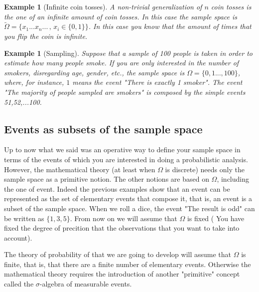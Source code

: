 \documentclass[12pt]{article}
\newtheorem{example}[theorem]{Example}
\newcommand{\<}{{\langle \!\! \langle}}
\renewcommand{\>}{{\rangle \!\! \rangle}}
\newcommand{\commento}[1]{
	\par\noindent
	\colorbox{light}{\begin{minipage}{120 mm}#1\end{minipage}}
	\par\noindent
}
\begin{document}
\begin{example}[Infinite coin tosses]
A non-trivial generalization of $n$ coin tosses is the one of an infinite amount of coin tosses. In this case the sample space is 
$\tilde{\Omega}=\{x_1...x_n...\, ,\, x_i\in\{0,1\}\}$. In this case you know that the amount of times that you flip the coin is infinite. 

 
\end{example}

%


\begin{example}[Sampling]
 Suppose that a sample of 100 people is taken in order to estimate how many people smoke. If you are only interested in the number of smokers, disregarding age, gender, etc., the sample space is  $\Omega=\{0,1...,100\}$, where, for instance, $1$ means the event "There is exactly 1 smoker". The event "The majority of people sampled are smokers" is composed by the simple events 51,52,...100.  
\end{example}



\subsection{Events as subsets of the sample space}

Up to now what we said was an operative way to define your sample space in terms of the events of which you are interested in doing a probabilistic analysis. However, the mathematical theory (at least when $\Omega$ is discrete) needs only the sample space as a primitive notion. The other notions are based on $\Omega$, including the one of event. Indeed the previous examples show that an event can be represented as the set of elementary events that compose it, that is, an event is a subset of the sample space.
 When we roll a dice, the event "The result is odd"  can be written as $\{1,3,5\}$.
From now on we will assume that $\Omega$ is fixed ( You have fixed the degree of precition that the observations that you want to take into account). 
\commento{ The theory of probability of that we are going to develop will assume that $\Omega$ is finite, that is, that there are a finite number of elementary events. Otherwise the mathematical theory requires the introduction of another "primitive" concept called the $\sigma$-algebra of measurable events.}
\end{document}
